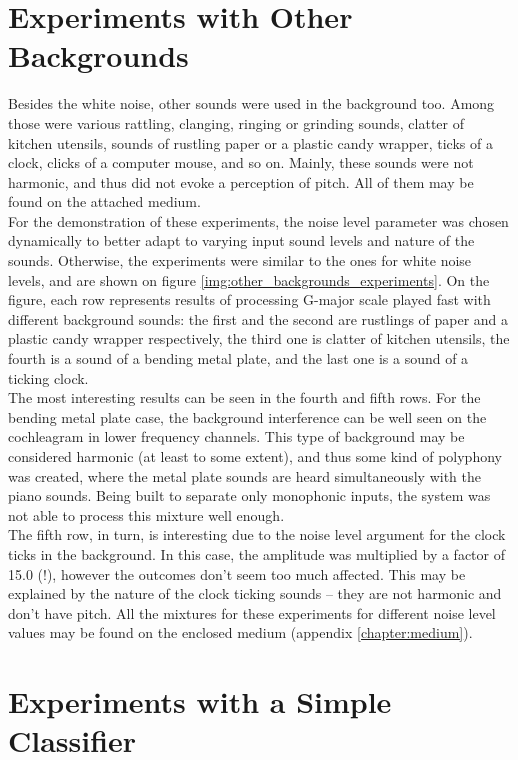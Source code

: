 \section{Experiments with Other Backgrounds}

Besides the white noise, other sounds were used in the background too. Among those were various rattling, clanging, ringing or grinding sounds, clatter of kitchen utensils, sounds of rustling paper or a plastic candy wrapper, ticks of a clock, clicks of a computer mouse, and so on. Mainly, these sounds were not harmonic, and thus did not evoke a perception of pitch. All of them may be found on the attached medium.\\

For the demonstration of these experiments, the noise level parameter was chosen dynami\-cally to better adapt to varying input sound levels and nature of the sounds. Otherwise, the experiments were similar to the ones for white noise levels, and are shown on figure \ref{img:other_backgrounds_experiments}. On the figure, each row represents results of processing G-major scale played fast with different background sounds: the first and the second are rustlings of paper and a plastic candy wrapper respectively, the third one is clatter of kitchen utensils, the fourth is a sound of a bending metal plate, and the last one is a sound of a ticking clock.\\

The most interesting results can be seen in the fourth and fifth rows. For the bending metal plate case, the background interference can be well seen on the cochleagram in lower frequency channels. This type of background may be considered harmonic (at least to some extent), and thus some kind of polyphony was created, where the metal plate sounds are heard simultaneously with the piano sounds. Being built to separate only monophonic inputs, the system was not able to process this mixture well enough.\\

The fifth row, in turn, is interesting due to the noise level argument for the clock ticks in the background. In this case, the amplitude was multiplied by a factor of 15.0 (!), however the outcomes don't seem too much affected. This may be explained by the nature of the clock ticking sounds -- they are not harmonic and don't have pitch. All the mixtures for these experiments for different noise level values may be found on the enclosed medium (appendix \ref{chapter:medium}).

\section{Experiments with a Simple Classifier}


